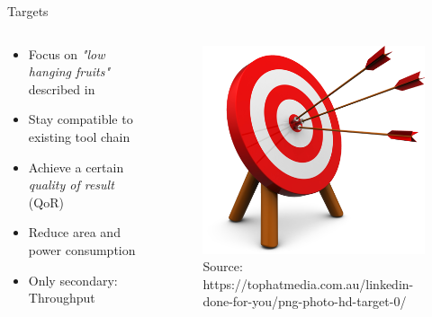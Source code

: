 \documentclass{beamer}
\begin{document}
\begin{frame}{Targets}
\begin {columns}
 \begin{column}{0.7\textwidth}
 
    \begin{itemize}
        \item<1->Focus on \textit{"low hanging fruits"} described in \cite{Mittal:2016:STA:2891449.2893356}
        \item<2->Stay compatible to existing tool chain
        \item<3->Achieve a certain \textit{quality of result} (QoR)
        \item<4->Reduce area and power consumption
        \item<5->Only secondary: Throughput
    \end{itemize}
    
 \end{column}
  \begin{column}{0.3\textwidth}
    \begin{figure}
     \includegraphics[width=\textwidth]{img/target.png}
     \caption{Source: https://tophatmedia.com.au/linkedin-done-for-you/png-photo-hd-target-0/}
    \end{figure}
  \end{column}
\end {columns}
\end{frame}
\end{document}
